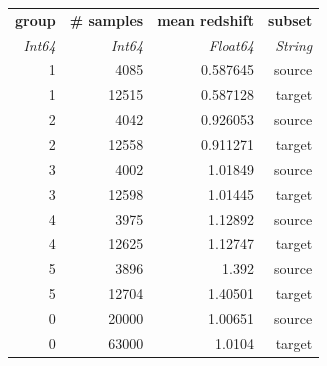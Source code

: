 \begin{tabular}{|r|r|r|r|}
  \hline
  \textbf{group} & \textbf{\# samples} & \textbf{mean redshift} & \textbf{subset} \\
  \textit{Int64} & \textit{Int64} & \textit{Float64} & \textit{String} \\
  \hline
  1 & 4085 & 0.587645 & source \\
  1 & 12515 & 0.587128 & target \\
  2 & 4042 & 0.926053 & source \\
  2 & 12558 & 0.911271 & target \\
  3 & 4002 & 1.01849 & source \\
  3 & 12598 & 1.01445 & target \\
  4 & 3975 & 1.12892 & source \\
  4 & 12625 & 1.12747 & target \\
  5 & 3896 & 1.392 & source \\
  5 & 12704 & 1.40501 & target \\
  0 & 20000 & 1.00651 & source \\
  0 & 63000 & 1.0104 & target \\
  \hline
\end{tabular}
